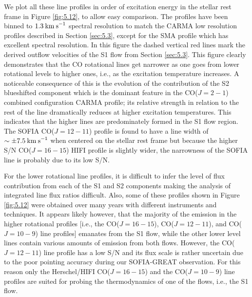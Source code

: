 We plot all these line profiles in order of excitation energy in the stellar rest frame in Figure \ref{fig:5.12}, to allow easy comparison. The profiles have been binned to $1.3\>{\rm km\>s}^{-1}$ spectral resolution to match the CARMA low resolution profiles described in Section \ref{sec:5.3}, except for the SMA profile which has excellent spectral resolution. In this figure the dashed vertical red lines mark the derived outflow velocities of the S1 flow from Section \ref{sec:5.3}. This figure clearly demonstrates  that the CO rotational lines get narrower as one goes from lower rotational levels to higher ones, i.e., as the excitation temperature increases. A noticeable consequence of this is the evolution of the contribution of the S2 blueshifted component which is the dominant feature in the CO($J=2-1$) combined configuration CARMA profile; its relative strength in relation to the rest of the line dramatically reduces at higher excitation temperatures. This indicates that the higher lines are predominately formed in the S1 flow region. The SOFIA CO($\textit{J} = 12-11$) profile is found to have a line width of $\sim \pm 7.5\>{\rm km\>s}^{-1}$ when centered on the stellar rest frame but because the higher S/N CO($J=16-15$) HIFI profile is slightly wider, the narrowness of the SOFIA line is probably due to its low S/N. 

For the lower rotational line profiles, it is difficult to infer the level of flux contribution from each of the S1 and S2 components making the analysis of integrated line flux ratios difficult. Also, some of these profiles shown in Figure \ref{fig:5.12} were obtained over many years with different instruments and techniques. It appears likely however, that the majority of the emission in the higher rotational profiles [i.e., the CO($J=16-15$), CO($J=12-11$), and CO($J=10-9$) line profiles] emanates from the S1 flow, while the other lower level lines contain various amounts of emission from both flows. However, the CO($J=12-11$) line profile has a low S/N and its flux scale is rather uncertain due to the poor pointing accuracy during our SOFIA-GREAT observation. For this reason only the Herschel/HIFI CO($J=16-15$) and the CO($J=10-9$) line profiles are suited for probing the thermodynamics of one of the flows, i.e., the S1 flow. 

